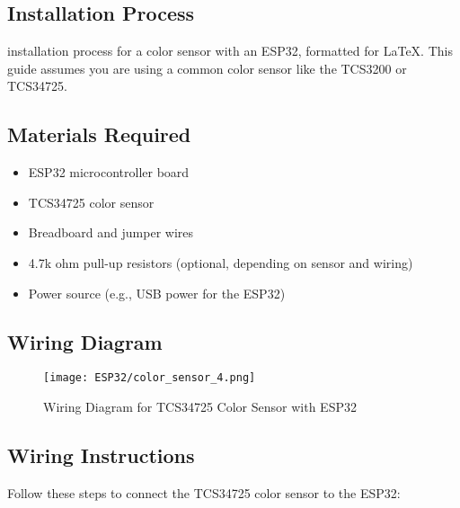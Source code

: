 \subsection*{Installation Process}

installation process for a color sensor with an ESP32, formatted for LaTeX. This guide assumes you are using a common color sensor like the TCS3200 or TCS34725.


\subsection*{Materials Required}
\begin{itemize}
	\item ESP32 microcontroller board
	\item TCS34725 color sensor
	\item Breadboard and jumper wires
	\item 4.7k ohm pull-up resistors (optional, depending on sensor and wiring)
	\item Power source (e.g., USB power for the ESP32)
\end{itemize}

\subsection*{Wiring Diagram}
\begin{figure}[h]
	\centering
		\texttt{[image: ESP32/color\_sensor\_4.png]}
	\caption{Wiring Diagram for TCS34725 Color Sensor with ESP32}
	\label{fig:wiring}
\end{figure}

\subsection*{Wiring Instructions}
Follow these steps to connect the TCS34725 color sensor to the ESP32:

